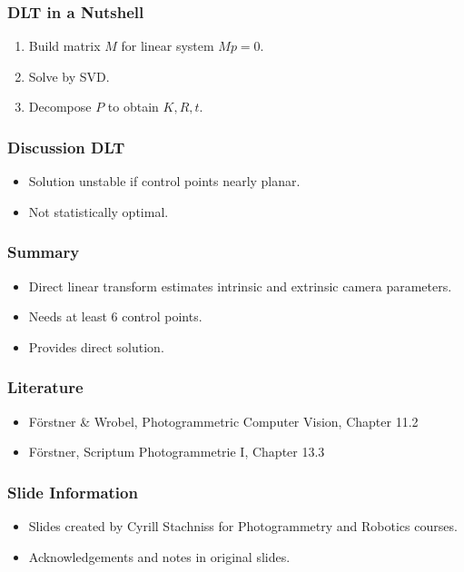 \begin{frame}
  \frametitle{DLT in a Nutshell}
  \begin{enumerate}
    \item Build matrix $M$ for linear system $M p = 0$.
    \item Solve by SVD.
    \item Decompose $P$ to obtain $K,R,t$.
  \end{enumerate}
\end{frame}

\begin{frame}
  \frametitle{Discussion DLT}
  \begin{itemize}
    \item Solution unstable if control points nearly planar.
    \item Not statistically optimal.
  \end{itemize}
\end{frame}

\begin{frame}
  \frametitle{Summary}
  \begin{itemize}
    \item Direct linear transform estimates intrinsic and extrinsic camera parameters.
    \item Needs at least 6 control points.
    \item Provides direct solution.
  \end{itemize}
\end{frame}

\begin{frame}
  \frametitle{Literature}
  \begin{itemize}
    \item Förstner \& Wrobel, Photogrammetric Computer Vision, Chapter 11.2
    \item Förstner, Scriptum Photogrammetrie I, Chapter 13.3
  \end{itemize}
\end{frame}

\begin{frame}
  \frametitle{Slide Information}
  \begin{itemize}
    \item Slides created by Cyrill Stachniss for Photogrammetry and Robotics courses.
    \item Acknowledgements and notes in original slides.
  \end{itemize}
\end{frame}





